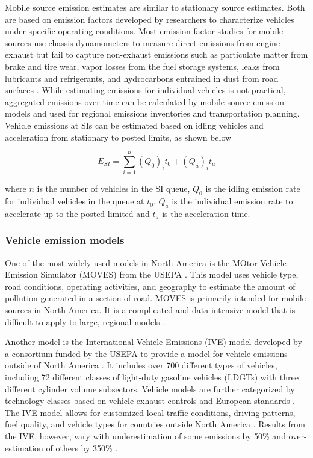 Mobile source emission estimates are similar to stationary source estimates. Both are based on emission factors developed by researchers to characterize vehicles under specific operating conditions. Most emission factor studies for mobile sources use chassis dynamometers to measure direct emissions from engine exhaust but fail to capture non-exhaust emissions such as particulate matter from brake and tire wear, vapor losses from the fuel storage systems, leaks from lubricants and refrigerants, and hydrocarbons entrained in dust from road surfaces \citep{Kam2012, Franco2013}. While estimating emissions for individual vehicles is not practical, aggregated emissions over time can be calculated by mobile source emission models and used for regional emissions inventories and transportation planning. Vehicle emissions at SIs can be estimated based on idling vehicles and acceleration from stationary to posted limits, as shown below

\begin{equation}
\label{eq:siemissions}
E_{SI}=\sum_{i=1}^{n}(Q_{0})_{i}t_{0} + (Q_{a})_{i}t_{a}
\end{equation}

\noindent
where $n$ is the number of vehicles in the SI queue, $Q_{0}$ is the idling emission rate for individual vehicles in the queue at $t_{0}$.  $Q_{a}$ is the individual emission rate to accelerate up to the posted limited  and $t_{a}$ is the  acceleration time.

\subsubsection{Vehicle emission models} \label{sssec:VehEmissionModels}

One of the most widely used models in North America is the MOtor Vehicle Emission Simulator (MOVES) from the USEPA \citep{MOVES2014a}. This model uses vehicle type, road conditions, operating activities, and geography to estimate the amount of pollution generated in a section of road. MOVES is primarily intended for mobile sources in North America. It is a complicated and data-intensive model that is difficult to apply to large, regional models \citep{Zhang2011}.

Another model is the International Vehicle Emissions (IVE) model developed by a consortium funded by the USEPA to provide a model for vehicle emissions outside of North America \citep{IVE2008}. It includes over 700 different types of vehicles, including 72 different classes of light-duty gasoline vehicles (LDGTs) with three different cylinder volume subsectors. Vehicle models are further categorized by technology classes based on vehicle exhaust controls and European standards \citep{Davis2005}. The IVE model allows for customized local traffic conditions, driving patterns, fuel quality, and vehicle types for countries outside North America \citep{Davis2010}. Results from the IVE, however, vary with underestimation of some emissions by 50\% and over-estimation of others by 350\% \citep{Hui2007}.

